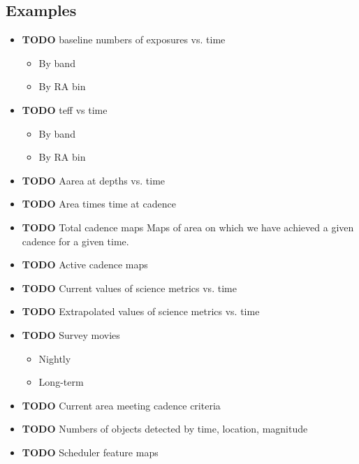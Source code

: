 \subsection{Examples}
\label{sec:org4d414fe}
\begin{itemize}
\item {\bfseries\sffamily TODO} baseline numbers of exposures vs. time
\label{sec:orgf108039}
\begin{itemize}
\item By band
\label{sec:org561e2d6}
\item By RA bin
\label{sec:orge214195}
\end{itemize}
\item {\bfseries\sffamily TODO} teff vs time
\label{sec:orga3a400a}
\begin{itemize}
\item By band
\label{sec:orgc84b8fa}
\item By RA bin
\label{sec:org9b69f40}
\end{itemize}
\item {\bfseries\sffamily TODO} Aarea at depths vs. time
\label{sec:orgbb93971}
\item {\bfseries\sffamily TODO} Area times time at cadence
\label{sec:orgf866aac}
\item {\bfseries\sffamily TODO} Total cadence maps
\label{sec:org5fd3913}
Maps of area on which we have achieved a given cadence for a given time.
\item {\bfseries\sffamily TODO} Active cadence maps
\label{sec:orgc1dd5e1}
\item {\bfseries\sffamily TODO} Current values of science metrics vs. time
\label{sec:org85fb11d}
\item {\bfseries\sffamily TODO} Extrapolated values of science metrics vs. time
\label{sec:org9812729}
\item {\bfseries\sffamily TODO} Survey movies
\label{sec:org0aa4447}
\begin{itemize}
\item Nightly
\label{sec:orgda2c7c7}
\item Long-term
\label{sec:org276b67a}
\end{itemize}
\item {\bfseries\sffamily TODO} Current area meeting cadence criteria
\label{sec:orgdce2144}
\item {\bfseries\sffamily TODO} Numbers of objects detected by time, location, magnitude
\label{sec:orgd4ddd4a}
\item {\bfseries\sffamily TODO} Scheduler feature maps

\end{itemize}
